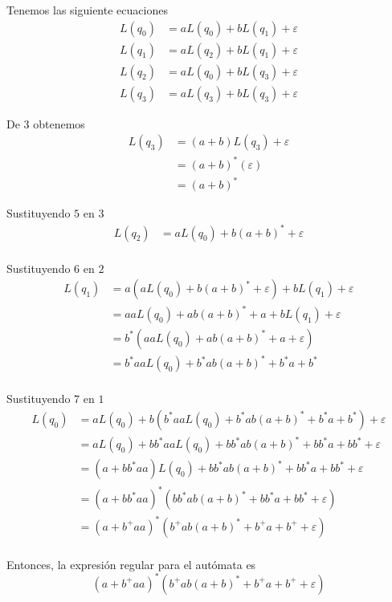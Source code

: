 {  \setcounter{equation}{0}
  Tenemos las siguiente ecuaciones
  \begin{align}
    L(q_0) &= aL(q_0) + bL(q_1) + \varepsilon \\
    L(q_1) &= aL(q_2) + bL(q_1) + \varepsilon \\
    L(q_2) &= aL(q_0) + bL(q_3) + \varepsilon \\
    L(q_3) &= aL(q_3) + bL(q_3) + \varepsilon 
  \end{align}

  De $3$ obtenemos
  \begin{equation}
  \begin{aligned}
    L(q_3) &= (a + b)L(q_3) + \varepsilon \\
          &= (a + b)^* (\varepsilon) \\
          &= (a + b)^* 
  \end{aligned}
  \end{equation}

  Sustituyendo $5$ en $3$
  \begin{equation}
  \begin{aligned}
    L(q_2) &= aL(q_0) + b(a+b)^* + \varepsilon \\
  \end{aligned}
  \end{equation}

  Sustituyendo $6$ en $2$
  \begin{equation}
  \begin{aligned}
    L(q_1) &= a(aL(q_0) + b(a+b)^* + \varepsilon) + bL(q_1) + \varepsilon \\
          &= aaL(q_0) + ab(a+b)^* + a + bL(q_1) + \varepsilon \\
          &= b^* (aaL(q_0) + ab(a+b)^* + a + \varepsilon )\\
          &= b^*aaL(q_0) + b^*ab(a+b)^* + b^*a + b^* \\
  \end{aligned}
  \end{equation}

  Sustituyendo $7$ en $1$
  \begin{equation}
  \begin{aligned}
    L(q_0) &= aL(q_0) + b(b^*aaL(q_0) + b^*ab(a+b)^* + b^*a + b^* ) + \varepsilon \\
          &= aL(q_0) + bb^*aaL(q_0) + bb^*ab(a+b)^* + bb^*a + bb^* + \varepsilon \\
          &= (a + bb^*aa)L(q_0) + bb^*ab(a+b)^* + bb^*a + bb^* + \varepsilon \\
          &= (a + bb^*aa)^* (bb^*ab(a+b)^* + bb^*a + bb^* + \varepsilon)\\
          &= (a + b^+aa)^* (b^+ab(a+b)^* + b^+a + b^+ + \varepsilon)\\
  \end{aligned}
  \end{equation}

  Entonces, la expresión regular para el autómata es 
  $$\boxed{(a + b^+aa)^* (b^+ab(a+b)^* + b^+a + b^+ + \varepsilon)}$$
}
